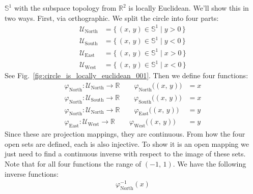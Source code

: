 \documentclass{article}
\theoremstyle{plain}
\theoremstyle{normal}
\newenvironment{example}{%
    \pushQED{\qed}\renewcommand{\qedsymbol}{$\blacksquare$}\examplex%
}{%
    \popQED\endexamplex%
}
\begin{document}
        \begin{example}
            $\mathbb{S}^{1}$ with the subspace topology from $\mathbb{R}^{2}$
            is locally Euclidean. We'll show this in two ways. First, via
            orthographic. We split the circle into four parts:
            \begin{align}
                \mathcal{U}_{\textrm{North}}
                &=\{\,(x,\,y)\in\mathbb{S}^{1}\;|\;y>0\,\}\\
                \mathcal{U}_{\textrm{South}}
                &=\{\,(x,\,y)\in\mathbb{S}^{1}\;|\;y<0\,\}\\
                \mathcal{U}_{\textrm{East}}
                &=\{\,(x,\,y)\in\mathbb{S}^{1}\;|\;x>0\,\}\\
                \mathcal{U}_{\textrm{West}}
                &=\{\,(x,\,y)\in\mathbb{S}^{1}\;|\;x<0\,\}
            \end{align}
            See Fig.~\ref{fig:circle_is_locally_euclidean_001}.
            Then we define four functions:
            \begin{align}
                \varphi_{\textrm{North}}:
                \mathcal{U}_{\textrm{North}}\rightarrow\mathbb{R}
                \quad\quad
                \varphi_{\textrm{North}}\big((x,\,y)\big)&=x\\
                \varphi_{\textrm{North}}:
                \mathcal{U}_{\textrm{South}}\rightarrow\mathbb{R}
                \quad\quad
                \varphi_{\textrm{South}}\big((x,\,y)\big)&=x\\
                \varphi_{\textrm{North}}:
                \mathcal{U}_{\textrm{North}}\rightarrow\mathbb{R}
                \quad\quad
                \varphi_{\textrm{East}}\big((x,\,y)\big)&=y\\
                \varphi_{\textrm{East}}:
                \mathcal{U}_{\textrm{West}}\rightarrow\mathbb{R}
                \quad\quad
                \varphi_{\textrm{West}}\big((x,\,y)\big)&=y
            \end{align}
            Since these are projection mappings, they are continuous. From
            how the four open sets are defined, each is also injective. To
            show it is an open mapping we just need to find a continuous
            inverse with respect to the image of these sets. Note that for all
            four functions the range of $(-1,\,1)$. We have the following
            inverse functions:
            \begin{align}
                \varphi_{\textrm{North}}^{-1}(x)

\end{align}
\end{example}
\end{document}
